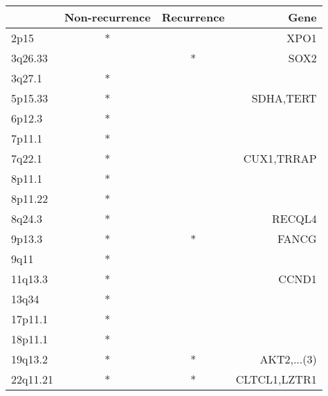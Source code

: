 \begin{tabular}{lccr}
\toprule
{} & Non-recurrence & Recurrence &          Gene \\
\midrule
2p15     &              * &            &          XPO1 \\
3q26.33  &                &          * &          SOX2 \\
3q27.1   &              * &            &               \\
5p15.33  &              * &            &     SDHA,TERT \\
6p12.3   &              * &            &               \\
7p11.1   &              * &            &               \\
7q22.1   &              * &            &    CUX1,TRRAP \\
8p11.1   &              * &            &               \\
8p11.22  &              * &            &               \\
8q24.3   &              * &            &        RECQL4 \\
9p13.3   &              * &          * &         FANCG \\
9q11     &              * &            &               \\
11q13.3  &              * &            &         CCND1 \\
13q34    &              * &            &               \\
17p11.1  &              * &            &               \\
18p11.1  &              * &            &               \\
19q13.2  &              * &          * &   AKT2,...(3) \\
22q11.21 &              * &          * &  CLTCL1,LZTR1 \\
\bottomrule
\end{tabular}
